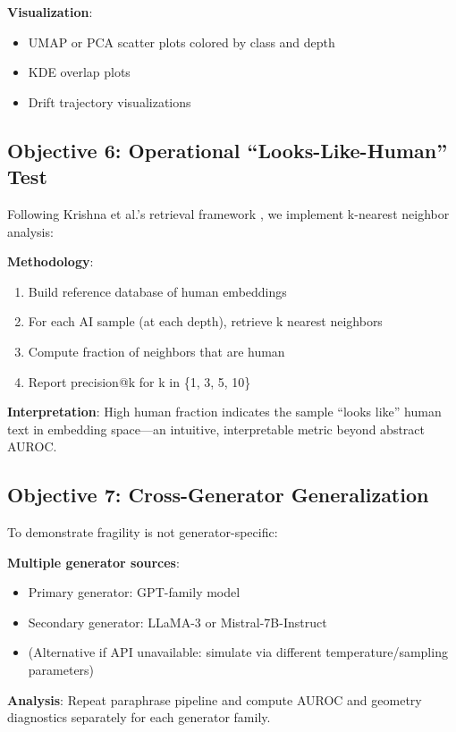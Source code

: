 \documentclass[conference]{IEEEtran}
\begin{document}
\textbf{Visualization}:
\begin{itemize}
    \item UMAP or PCA scatter plots colored by class and depth
    \item KDE overlap plots
    \item Drift trajectory visualizations
\end{itemize}

\subsection{Objective 6: Operational ``Looks-Like-Human'' Test}

Following Krishna et al.'s retrieval framework \cite{krishna2023paraphrasing}, we implement k-nearest neighbor analysis:

\textbf{Methodology}:
\begin{enumerate}
    \item Build reference database of human embeddings
    \item For each AI sample (at each depth), retrieve k nearest neighbors
    \item Compute fraction of neighbors that are human
    \item Report precision@k for k in \{1, 3, 5, 10\}
\end{enumerate}

\textbf{Interpretation}: High human fraction indicates the sample ``looks like'' human text in embedding space—an intuitive, interpretable metric beyond abstract AUROC.

\subsection{Objective 7: Cross-Generator Generalization}

To demonstrate fragility is not generator-specific:

\textbf{Multiple generator sources}:
\begin{itemize}
    \item Primary generator: GPT-family model
    \item Secondary generator: LLaMA-3 or Mistral-7B-Instruct
    \item (Alternative if API unavailable: simulate via different temperature/sampling parameters)
\end{itemize}

\textbf{Analysis}: Repeat paraphrase pipeline and compute AUROC and geometry diagnostics separately for each generator family.
\end{document}
